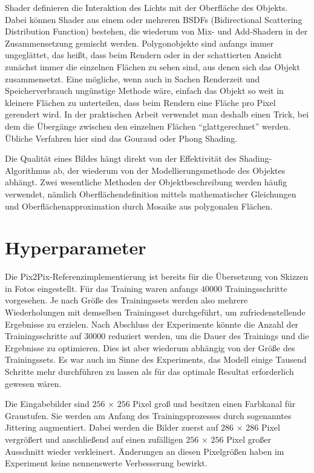 Shader definieren die Interaktion des Lichts mit der Oberfläche des Objekts. Dabei können Shader aus einem oder mehreren BSDFs (Bidirectional Scattering Distribution Function) bestehen, die wiederum von Mix- und Add-Shadern in der Zusammensetzung gemischt werden. Polygonobjekte sind anfangs immer ungeglättet, das heißt, dass beim Rendern oder in der schattierten Ansicht zunächst immer die einzelnen Flächen zu sehen sind, aus denen sich das Objekt zusammensetzt. Eine mögliche, wenn auch in Sachen Renderzeit und Speicherverbrauch ungünstige Methode wäre, einfach das Objekt so weit in kleinere Flächen zu unterteilen, dass beim Rendern eine Fläche pro Pixel gerendert wird. In der praktischen Arbeit verwendet man deshalb einen Trick, bei dem die Übergänge zwischen den einzelnen Flächen ``glattgerechnet'' werden. Übliche Verfahren hier sind das Gouraud oder Phong Shading. \cite{wartmann2014blender}

Die Qualität eines Bildes hängt direkt von der Effektivität des Shading-Algorithmus ab, der wiederum von der Modellierungsmethode des Objektes abhängt. Zwei wesentliche Methoden der Objektbeschreibung werden häufig verwendet, nämlich Oberflächendefinition mittels mathematischer Gleichungen und Oberflächenapproximation durch Mosaike aus polygonalen Flächen. \cite{phong1975shading}


\section{Hyperparameter}
\label{sec:hyperparams}
Die Pix2Pix-Referenzimplementierung ist bereits für die Übersetzung von Skizzen in Fotos eingestellt. Für das Training waren anfangs $40000$ Trainingsschritte vorgesehen. Je nach Größe des Trainingssets werden also mehrere Wiederholungen mit demselben Trainingsset durchgeführt, um zufriedenstellende Ergebnisse zu erzielen. Nach Abschluss der Experimente könnte die Anzahl der Trainingsschritte auf $30000$ reduziert werden, um die Dauer des Trainings und die Ergebnisse zu optimieren. Dies ist aber wiederum abhängig von der Größe des Trainingssets. Es war auch im Sinne des Experiments, das Modell einige Tausend Schritte mehr durchführen zu lassen als für das optimale Resultat erforderlich gewesen wären.

Die Eingabebilder sind $256\,\times\,256$ Pixel groß und besitzen einen Farbkanal für Graustufen. Sie werden am Anfang des Trainingsprozesses durch sogenanntes Jittering augmentiert. Dabei werden die Bilder zuerst auf $286\,\times\,286$ Pixel vergrößert und anschließend auf einen zufälligen $256\,\times\,256$ Pixel großer Ausschnitt wieder verkleinert. Änderungen an diesen Pixelgrößen haben im Experiment keine nennenswerte Verbesserung bewirkt.

